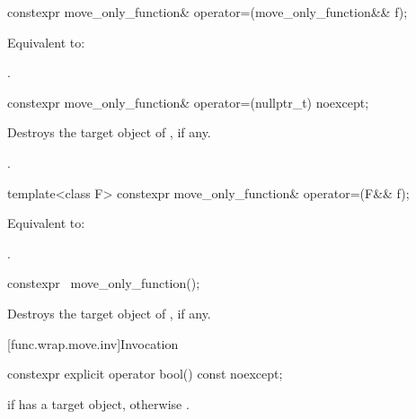 %
\begin{itemdecl}
constexpr move_only_function& operator=(move_only_function&& f);
\end{itemdecl}

\begin{itemdescr}
\pnum
\effects
Equivalent to: 

\pnum
\returns
{}.
\end{itemdescr}

%
\begin{itemdecl}
constexpr move_only_function& operator=(nullptr_t) noexcept;
\end{itemdecl}

\begin{itemdescr}
\pnum
\effects
Destroys the target object of , if any.

\pnum
\returns
{}.
\end{itemdescr}

%
\begin{itemdecl}
template<class F>
  constexpr move_only_function& operator=(F&& f);
\end{itemdecl}

\begin{itemdescr}
\pnum
\effects
Equivalent to: 

\pnum
\returns
{}.
\end{itemdescr}

%
\begin{itemdecl}
constexpr ~move_only_function();
\end{itemdecl}

\begin{itemdescr}
\pnum
\effects
Destroys the target object of , if any.
\end{itemdescr}

[func.wrap.move.inv]{Invocation}

%
\begin{itemdecl}
constexpr explicit operator bool() const noexcept;
\end{itemdecl}

\begin{itemdescr}
\pnum
\returns
{} if  has a target object, otherwise .
\end{itemdescr}

